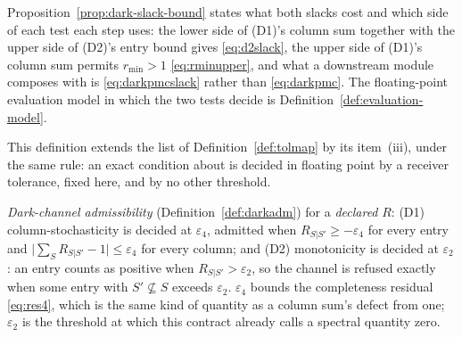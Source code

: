 
Proposition~\ref{prop:dark-slack-bound} states what both slacks cost and which
side of each test each step uses: the lower side of (D1)'s column sum together
with the upper side of (D2)'s entry bound gives \eqref{eq:d2slack}, the upper
side of (D1)'s column sum permits $r_{\min}>1$ \eqref{eq:rminupper}, and what a
downstream module composes with is \eqref{eq:darkpmcslack} rather than
\eqref{eq:darkpmc}. The floating-point evaluation model in which the two tests
decide is Definition~\ref{def:evaluation-model}.

\begin{definition}
\label{def:darktol}
This definition extends the list of Definition~\ref{def:tolmap} by its
item~(iii), under the same rule: an exact condition about 
is decided in floating point by a receiver
tolerance, fixed here, and by no other threshold.

\emph{Dark-channel admissibility} (Definition~\ref{def:darkadm}) for a
\emph{declared} $R$: (D1) column-stochasticity is decided at
$\varepsilon_4$, admitted when $R_{S|S'}\ge-\varepsilon_4$ for every
entry and $\big|\sum_SR_{S|S'}-1\big|\le\varepsilon_4$ for every column;
and (D2) monotonicity is decided at $\varepsilon_2$: an entry counts as
positive when $R_{S|S'}>\varepsilon_2$, so the channel is refused exactly
when some entry with $S'\not\subseteq S$ exceeds $\varepsilon_2$.
$\varepsilon_4$ bounds the completeness residual \eqref{eq:res4}, which is
the same kind of quantity as a column sum's defect from one; $\varepsilon_2$
is the threshold at which this contract already calls a spectral quantity
zero.
\end{definition}
